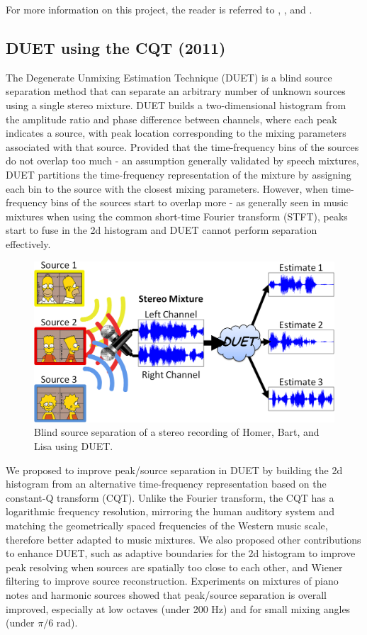 \documentclass{article}
\begin{document}
For more information on this project, the reader is referred to \cite{article_sabin_jun2013}, \cite{inproceedings_rafii_oct2009}, and 
\cite{report_rafii_2009}.


\subsection{DUET using the CQT (2011)}
\label{ssec:duet}

The Degenerate Unmixing Estimation Technique (DUET) is a blind source separation method that can separate an arbitrary number of unknown sources using a single stereo mixture. DUET builds a two-dimensional histogram from the amplitude ratio and phase difference between channels, where each peak indicates a source, with peak location corresponding to the mixing parameters associated with that source. Provided that the time-frequency bins of the sources do not overlap too much - an assumption generally validated by speech mixtures, DUET partitions the time-frequency representation of the mixture by assigning each bin to the source with the closest mixing parameters. However, when time-frequency bins of the sources start to overlap more - as generally seen in music mixtures when using the common short-time Fourier transform (STFT), peaks start to fuse in the 2d histogram and DUET cannot perform separation effectively.

\begin{figure}[!htb]
\centering
\includegraphics[width=\columnwidth]{Images/duet.png}
\caption{Blind source separation of a stereo recording of Homer, Bart, and Lisa using DUET.}
\label{fig:duet}
\end{figure}

We proposed to improve peak/source separation in DUET by building the 2d histogram from an alternative time-frequency representation based on the constant-Q transform (CQT). Unlike the Fourier transform, the CQT has a logarithmic frequency resolution, mirroring the human auditory system and matching the geometrically spaced frequencies of the Western music scale, therefore better adapted to music mixtures. We also proposed other contributions to enhance DUET, such as adaptive boundaries for the 2d histogram to improve peak resolving when sources are spatially too close to each other, and Wiener filtering to improve source reconstruction. Experiments on mixtures of piano notes and harmonic sources showed that peak/source separation is overall improved, especially at low octaves (under 200 Hz) and for small mixing angles (under ${\pi}/{6}$ rad).
\end{document}
